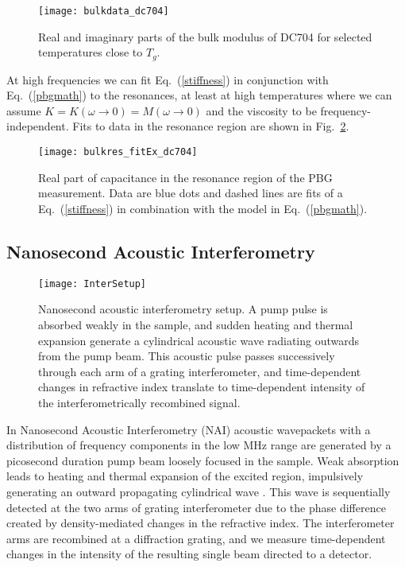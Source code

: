 \documentclass[reprint,showpacs,amsmath,amssymb,aip,jcp]{revtex4-1}
\begin{document}
\begin{figure}
  \texttt{[image: bulkdata\_dc704]}
  \caption{\label{bulkdata}Real and imaginary parts of the bulk
    modulus of DC704 for selected temperatures close to $T_g$.}
\end{figure}

At high frequencies we can fit Eq.~(\ref{stiffness}) in conjunction with
Eq.\ (\ref{pbgmath}) to the resonances, at least at high temperatures
where we can assume $K = K(\omega\rightarrow 0) = M(\omega\rightarrow
0)$ and the viscosity to be frequency-independent. Fits to data in the
resonance region are shown in Fig.\ \ref{bulkres_fitEx_dc704}.

\begin{figure}
  \texttt{[image: bulkres\_fitEx\_dc704]}
  \caption{\label{bulkres_fitEx_dc704}Real part of capacitance in the
    resonance region of the PBG measurement. Data are blue dots and
    dashed lines are fits of a Eq.\ (\ref{stiffness}) in combination
    with the model in Eq.\ (\ref{pbgmath}).}
\end{figure}




\subsection{Nanosecond Acoustic Interferometry}\label{sec:NAI}

\begin{figure}
  \texttt{[image: InterSetup]}
  \caption{\label{fig:intersetup}Nanosecond acoustic interferometry
    setup.  A pump pulse is absorbed weakly in the sample, and sudden
    heating and thermal expansion generate a cylindrical acoustic wave
    radiating outwards from the pump beam. This acoustic pulse passes
    successively through each arm of a grating interferometer, and
    time-dependent changes in refractive index translate to
    time-dependent intensity of the interferometrically recombined
    signal.}
\end{figure}

In Nanosecond Acoustic Interferometry (NAI) acoustic wavepackets with
a distribution of frequency components in the low MHz range are
generated by a picosecond duration pump beam loosely focused in the
sample. Weak absorption leads to heating and thermal expansion of the
excited region, impulsively generating an outward propagating
cylindrical wave \cite{sPatel1981,sNeubrand1992}. This wave is
sequentially detected at the two arms of grating interferometer
\cite{sHess1996,sGlorieux2004} due to the phase difference created by
density-mediated changes in the refractive index.  The interferometer
arms are recombined at a diffraction grating, and we measure
time-dependent changes in the intensity of the resulting single beam
directed to a detector.
\end{document}
